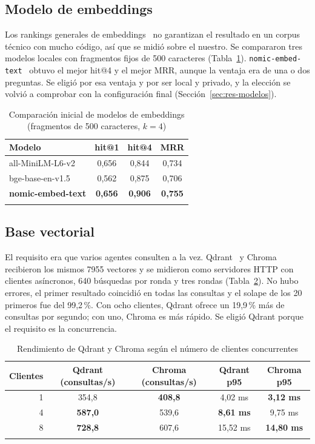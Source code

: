 \documentclass[pdflatex,sn-mathphys-num]{sn-jnl}
\begin{document}
\subsection{Modelo de embeddings}\label{sec:res-emb}

Los rankings generales de embeddings~\cite{muennighoff2023mteb} no garantizan el resultado en un corpus técnico con mucho código, así que se midió sobre el nuestro. Se compararon tres modelos locales con fragmentos fijos de 500 caracteres (Tabla~\ref{tab:emb}). \texttt{nomic-embed-text}~\cite{nussbaum2024nomic} obtuvo el mejor hit@4 y el mejor MRR, aunque la ventaja era de una o dos preguntas. Se eligió por esa ventaja y por ser local y privado, y la elección se volvió a comprobar con la configuración final (Sección~\ref{sec:res-modelos}).

\begin{table}[h]
\caption{Comparación inicial de modelos de embeddings (fragmentos de 500 caracteres, $k=4$)}\label{tab:emb}
\begin{tabular}{@{}lccc@{}}
\toprule
Modelo & hit@1 & hit@4 & MRR \\
\midrule
all-MiniLM-L6-v2~\cite{wang2020minilm} & 0,656 & 0,844 & 0,734 \\
bge-base-en-v1.5~\cite{xiao2023cpack} & 0,562 & 0,875 & 0,706 \\
\textbf{nomic-embed-text} & \textbf{0,656} & \textbf{0,906} & \textbf{0,755} \\
\botrule
\end{tabular}
\end{table}

\subsection{Base vectorial}\label{sec:res-bd}

El requisito era que varios agentes consulten a la vez. Qdrant~\cite{qdrantasync} y Chroma~\cite{chromaarch} recibieron los mismos 7955 vectores y se midieron como servidores HTTP con clientes asíncronos, 640 búsquedas por ronda y tres rondas (Tabla~\ref{tab:bd}). No hubo errores, el primer resultado coincidió en todas las consultas y el solape de los 20 primeros fue del 99,2\,\%. Con ocho clientes, Qdrant ofrece un 19,9\,\% más de consultas por segundo; con uno, Chroma es más rápido. Se eligió Qdrant porque el requisito es la concurrencia.

\begin{table}[h]
\caption{Rendimiento de Qdrant y Chroma según el número de clientes concurrentes}\label{tab:bd}
\begin{tabular}{@{}rcccc@{}}
\toprule
Clientes & Qdrant (consultas/s) & Chroma (consultas/s) & Qdrant p95 & Chroma p95 \\
\midrule
1 & 354,8 & \textbf{408,8} & 4,02 ms & \textbf{3,12 ms} \\
4 & \textbf{587,0} & 539,6 & \textbf{8,61 ms} & 9,75 ms \\
8 & \textbf{728,8} & 607,6 & 15,52 ms & \textbf{14,80 ms} \\
\botrule
\end{tabular}
\end{table}
\end{document}
